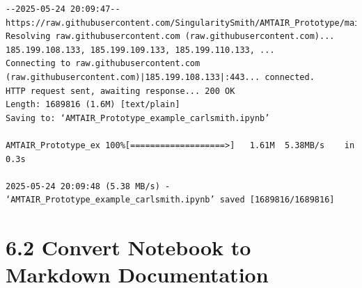 \documentclass[
  11pt,
  letterpaper,
]{book}
\begin{document}
\begin{verbatim}
--2025-05-24 20:09:47--  https://raw.githubusercontent.com/SingularitySmith/AMTAIR_Prototype/main/data/example_carlsmith/AMTAIR_Prototype_example_carlsmith.ipynb
Resolving raw.githubusercontent.com (raw.githubusercontent.com)... 185.199.108.133, 185.199.109.133, 185.199.110.133, ...
Connecting to raw.githubusercontent.com (raw.githubusercontent.com)|185.199.108.133|:443... connected.
HTTP request sent, awaiting response... 200 OK
Length: 1689816 (1.6M) [text/plain]
Saving to: ‘AMTAIR_Prototype_example_carlsmith.ipynb’

AMTAIR_Prototype_ex 100%[===================>]   1.61M  5.38MB/s    in 0.3s    

2025-05-24 20:09:48 (5.38 MB/s) - ‘AMTAIR_Prototype_example_carlsmith.ipynb’ saved [1689816/1689816]
\end{verbatim}

\section{6.2 Convert Notebook to Markdown
Documentation}\label{convert-notebook-to-markdown-documentation}
\end{document}
